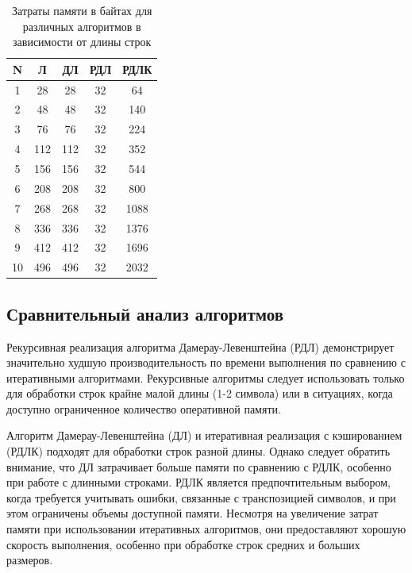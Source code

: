 \begin{table}[ht]
	\label{tab:memory}
	\begin{center}
		\caption{Затраты памяти в байтах для различных алгоритмов в зависимости от длины строк }
		\begin{tabular}{|c|c|c|c|c|}
			\hline
			N & Л & ДЛ & РДЛ & РДЛК \\
			\hline
			1  & 28  & 28  & 32  & 64  \\
			2  & 48  & 48  & 32  & 140  \\
			3  & 76  & 76  & 32  & 224  \\
			4  & 112 & 112 & 32  & 352  \\
			5  & 156 & 156 & 32  & 544  \\
			6  & 208 & 208 & 32  & 800  \\
			7  & 268 & 268 & 32  & 1088  \\
			8  & 336 & 336 & 32  & 1376  \\
			9  & 412 & 412 & 32  & 1696  \\
			10 & 496 & 496 & 32  & 2032  \\
			\hline
		\end{tabular}
		\label{tab:memory}
	\end{center}
\end{table}

\subsection{Сравнительный анализ алгоритмов}

	Рекурсивная реализация алгоритма Дамерау-Левенштейна (РДЛ) демонстрирует значительно худшую производительность по времени выполнения по сравнению с итеративными алгоритмами. Рекурсивные алгоритмы следует использовать только для обработки строк крайне малой длины (1-2 символа) или в ситуациях, когда доступно ограниченное количество оперативной памяти.
	
	Алгоритм Дамерау-Левенштейна (ДЛ) и итеративная реализация с кэшированием (РДЛК) подходят для обработки строк разной длины. Однако следует обратить внимание, что ДЛ затрачивает больше памяти по сравнению с РДЛК, особенно при работе с длинными строками. РДЛК является предпочтительным выбором, когда требуется учитывать ошибки, связанные с транспозицией символов, и при этом ограничены объемы доступной памяти.
	Несмотря на увеличение затрат памяти при использовании итеративных алгоритмов, они предоставляют хорошую скорость выполнения, особенно при обработке строк средних и больших размеров.
	
